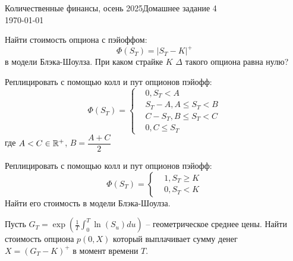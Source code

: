 \documentclass[12pt]{article}
\begin{document}
\noindent Количественные финансы, осень 2025\hfill Домашнее задание 4\\
\today

\hrulefill
\begin{problem}
    Найти стоимость опциона с пэйоффом:
    $$
        \Phi(S_T) = |S_T - K|^+
    $$в модели Блэка-Шоулза. При каком страйке $K$ $\Delta$ такого опциона равна нулю?
\end{problem}

\begin{problem}
    Реплицировать с помощью колл и пут опционов пэйофф:
    $$
        \Phi(S_T) = \begin{cases} 
            &0, S_T < A \\
            &S_T - A, A \leq S_T < B \\
            &C - S_T, B \leq S_T < C \\
            &0, C \leq S_T
         \end{cases}
    $$где $A<C \in \mathbb{R}^+$, $B = \dfrac{A+C}{2}$
\end{problem}

\begin{problem}
    Реплицировать с помощью колл и пут опционов пэйофф:
    $$
        \Phi(S_T) = \begin{cases} 
            &1, S_T \geq K \\
            &0, S_T < K
         \end{cases}
    $$Найти его стоимость в модели Блэка-Шоулза.
\end{problem}

\begin{problem} 
    Пусть $G_T = \exp\left( \frac{1}{T} \int_0^T \ln(S_u) du\right)$ -- геометрическое среднее цены.
    Найти стоимость опциона $p(0, X)$ который выплачивает сумму денег 
    $X = (G_T - K)^+$ в момент времени $T$.
\end{problem}
\end{document}
